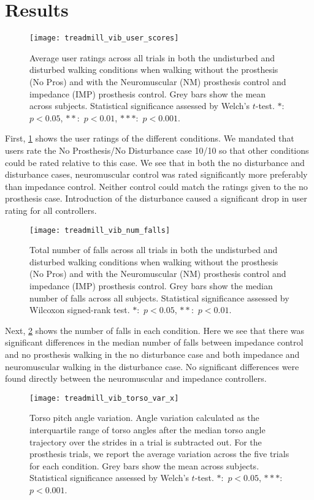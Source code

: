 \section{Results}
\begin{figure}[h]
    \centering 
    \texttt{[image: treadmill\_vib\_user\_scores]}
    \caption{Average user ratings across all trials in both the undisturbed and
    disturbed walking conditions when walking without the prosthesis (No Pros)
    and with the Neuromuscular (NM) prosthesis control and impedance (IMP)
    prosthesis control. Grey bars show the mean across subjects.  Statistical
    significance assessed by Welch's $t$-test. $*$:~$p < 0.05$, $**$:~$p <
    0.01$, $***$:~$p < 0.001$.}\label{fig:treadmill_user_ratings}
\end{figure}
First, \cref{fig:treadmill_user_ratings} shows the user ratings of the different
conditions. We mandated that users rate the No Prosthesis/No Disturbance case
10/10 so that other conditions could be rated relative to this case. We see that
in both the no disturbance and disturbance cases, neuromuscular control was
rated significantly more preferably than impedance control. Neither control
could match the ratings given to the no prosthesis case. Introduction of the
disturbance caused a significant drop in user rating for all controllers. 

\begin{figure}[h]
    \centering 
    \texttt{[image: treadmill\_vib\_num\_falls]}
    \caption{Total number of falls across all trials in both the undisturbed and
    disturbed walking conditions when walking without the prosthesis (No Pros)
    and with the Neuromuscular (NM) prosthesis control and impedance (IMP)
    prosthesis control. Grey bars show the median number of falls across all
    subjects. Statistical significance assessed by Wilcoxon signed-rank test.
    $*$:~$p < 0.05$, $**$:~$p < 0.01$.}\label{fig:treadmill_exp_falls}
\end{figure}
Next, \cref{fig:treadmill_exp_falls} shows the number of falls in each
condition. Here we see that there was significant differences in the median
number of falls between impedance control and no prosthesis walking in the no
disturbance case and both impedance and neuromuscular walking in the disturbance
case. No significant differences were found directly between the neuromuscular
and impedance controllers.

\begin{figure}[h]
    \centering 
    \texttt{[image: treadmill\_vib\_torso\_var\_x]}
    \caption{Torso pitch angle variation. Angle variation calculated as the
    interquartile range of torso angles after the median torso angle trajectory
    over the strides in a trial is subtracted out. For the prosthesis trials, we
    report the average variation across the five trials for each condition.
    Grey bars show the mean across subjects.  Statistical significance assessed
    by Welch's $t$-test. $*$:~$p < 0.05$, $***$:~$p <
    0.001$.}\label{fig:treadmill_exp_torso_var_x}
\end{figure}

